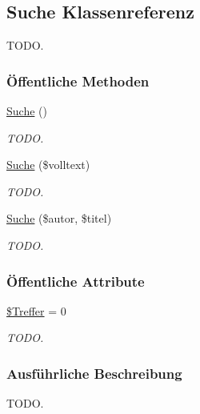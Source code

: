 \hypertarget{classSuche}{
\subsection{Suche Klassenreferenz}
\label{classSuche}
}
TODO.  


\subsubsection*{\"{O}ffentliche Methoden}
\begin{CompactItemize}
\item 
\hyperlink{classSuche_e863aff1c9abcb0308d5d3fdcdebb968}{Suche} ()
\begin{CompactList}\small\item\em TODO. \item\end{CompactList}\item 
\hyperlink{classSuche_05639fec18bd3193c01aafb08208ec94}{Suche} (\$volltext)
\begin{CompactList}\small\item\em TODO. \item\end{CompactList}\item 
\hyperlink{classSuche_4158769424a462492ac7821a0a30cf08}{Suche} (\$autor, \$titel)
\begin{CompactList}\small\item\em TODO. \item\end{CompactList}\end{CompactItemize}
\subsubsection*{\"{O}ffentliche Attribute}
\begin{CompactItemize}
\item 
\hyperlink{classSuche_0ee0e1ffb3f79392915fd39934d7140d}{\$Treffer} = 0
\begin{CompactList}\small\item\em TODO. \item\end{CompactList}\end{CompactItemize}


\subsubsection{Ausf\"{u}hrliche Beschreibung}
TODO. 


